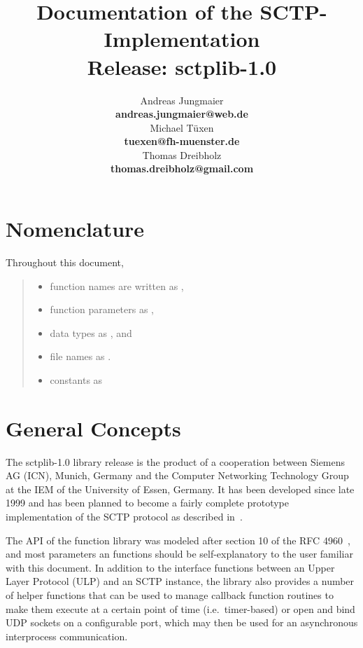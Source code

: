\documentclass[10pt]{article}
\title{Documentation of the SCTP-Implementation\\
	 Release: sctplib-1.0}
\author{Andreas Jungmaier\\
    \textbf{andreas.jungmaier@web.de}\\
	Michael T\"{u}xen\\
	\textbf{tuexen@fh-muenster.de}\\
   Thomas Dreibholz\\
   \textbf{thomas.dreibholz@gmail.com}}
\newcommand{\p}{\medskip \noindent }
\begin{document}
\maketitle

\fancyhf{}
\section{Nomenclature}
Throughout this document, 
\begin{quote}
\begin{itemize}
\item function names are written as ,
\item function parameters as , 
\item data types as , and
\item file names as .
\item constants as 
\end{itemize}
\end{quote}

\section{General Concepts}
The sctplib-1.0 library release is the product of a cooperation between
Siemens AG (ICN), Munich, Germany and the Computer Networking Technology Group
at the IEM of the University of Essen, Germany.
It has been developed since late 1999 and has been planned to become a fairly
complete prototype implementation of the SCTP protocol as described in~\cite{RFC4960}.

\p
The API of the function library was modeled after section 10 of the
RFC 4960~\cite{RFC4960},
and most parameters an functions should be self-explanatory to the user familiar
with this document.
In addition to the interface functions between an Upper Layer Protocol (ULP)
and an SCTP instance,
the library also provides a number of helper functions that can be used
to manage callback function routines to make them execute at a certain point of 
time (i.e.\ timer-based)
or open and bind  UDP sockets on a configurable port, which may then be used
for an asynchronous interprocess communication.
\end{document}
